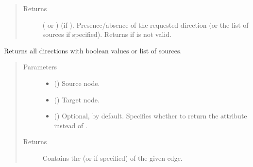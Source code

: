 \documentclass[letterpaper,10pt,english]{sphinxmanual}
\begin{document}
\begin{fulllineitems}
\begin{fulllineitems}
\begin{quote}
\begin{description}
\item[{Returns}] \leavevmode
( or ) \textendash{} (if ). Presence/absence
of the requested direction (or the list of sources if
specified). Returns  if  is not valid.

\end{description}\end{quote}

\end{fulllineitems}


\begin{fulllineitems}
\label{\detokenize{main:pypath.main.Direction.get_dirs}}
Returns all directions with boolean values or list of sources.
\begin{quote}\begin{description}
\item[{Parameters}] \leavevmode\begin{itemize}
\item {} 
 () \textendash{} Source node.

\item {} 
 () \textendash{} Target node.

\item {} 
 () \textendash{} Optional,  by default. Specifies whether to return
the  attribute instead of .

\end{itemize}

\item[{Returns}] \leavevmode
Contains the  (or  if
specified) of the given edge.

\end{description}\end{quote}

\end{fulllineitems}


\end{fulllineitems}
\end{document}
